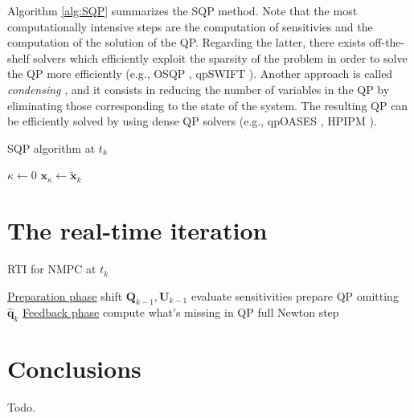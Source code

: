 Algorithm \ref{alg:SQP} summarizes the SQP method. Note that the most 
computationally intensive steps are the computation of sensitivies and the 
computation of the solution of the QP. Regarding the latter, there exists off-the-shelf
solvers which efficiently exploit the sparsity of the problem in order to
solve the QP more efficiently (e.g., OSQP \cite{Stellato2020OSQP}, qpSWIFT
\cite{Pandala2019qpSWIFT}). Another approach is called 
\textit{condensing} \cite{Bock1984MultipleShooting},
and it consists in reducing the number of variables in the QP by eliminating 
those corresponding to the state of the system. The resulting QP can be
efficiently solved by using dense QP solvers (e.g., qpOASES \cite{Ferreau2014qpOASES},
HPIPM \cite{Frison2020HPIPM}).

\begin{algorithm}
	\small
	\caption{SQP algorithm at $t_k$}
	\label{alg:SQP}
    $\kappa \leftarrow 0$\;
    $\bm{x}_\kappa \leftarrow \tilde{\bm{x}}_k$\;
    \;
\end{algorithm}


\section{The real-time iteration}
\begin{algorithm}
	\small
	\caption{RTI for NMPC at $t_k$}
	\label{alg:RTI}
    \underline{Preparation phase}\;
    shift $\bm{Q}_{k-1}, \bm{U}_{k-1}$\;
    evaluate sensitivities\;
    prepare QP omitting $\hat{\bm{q}}_k$\;
    \;
    \underline{Feedback phase}\;
    compute what's missing in QP\;
    full Newton step\;
    \;
\end{algorithm}

\section{Conclusions}
Todo.